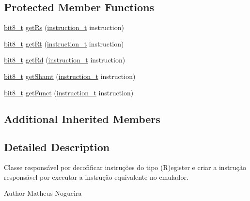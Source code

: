 \subsection*{Protected Member Functions}
\begin{DoxyCompactItemize}
\item 
\hyperlink{core_8hpp_a6074bae122ae7b527864eec42c728c3c}{bit8\+\_\+t} \hyperlink{classMIPS_1_1InstructionIDecoder_aece98d1c7f45c00c931e5955c1ec0bc1}{get\+Rs} (\hyperlink{core_8hpp_aa514fd240a0e29abb2a2e4c805d7f1a4}{instruction\+\_\+t} instruction)
\item 
\hyperlink{core_8hpp_a6074bae122ae7b527864eec42c728c3c}{bit8\+\_\+t} \hyperlink{classMIPS_1_1InstructionIDecoder_aec36994fb257983090e6f31b5c40ca6a}{get\+Rt} (\hyperlink{core_8hpp_aa514fd240a0e29abb2a2e4c805d7f1a4}{instruction\+\_\+t} instruction)
\item 
\hyperlink{core_8hpp_a6074bae122ae7b527864eec42c728c3c}{bit8\+\_\+t} \hyperlink{classMIPS_1_1InstructionIDecoder_a50819a3f711de2efa9033f27733b1562}{get\+Rd} (\hyperlink{core_8hpp_aa514fd240a0e29abb2a2e4c805d7f1a4}{instruction\+\_\+t} instruction)
\item 
\hyperlink{core_8hpp_a6074bae122ae7b527864eec42c728c3c}{bit8\+\_\+t} \hyperlink{classMIPS_1_1InstructionIDecoder_a9b3ae24c21814fcc896678ca70bedf90}{get\+Shamt} (\hyperlink{core_8hpp_aa514fd240a0e29abb2a2e4c805d7f1a4}{instruction\+\_\+t} instruction)
\item 
\hyperlink{core_8hpp_a6074bae122ae7b527864eec42c728c3c}{bit8\+\_\+t} \hyperlink{classMIPS_1_1InstructionIDecoder_a92735572aec9bdfd68d32af29b4ab86e}{get\+Funct} (\hyperlink{core_8hpp_aa514fd240a0e29abb2a2e4c805d7f1a4}{instruction\+\_\+t} instruction)
\end{DoxyCompactItemize}
\subsection*{Additional Inherited Members}


\subsection{Detailed Description}
Classe responsável por decofificar instruções do tipo (R)egister e criar a instrução responsável por executar a instrução equivalente no emulador.

\begin{DoxyAuthor}{Author}
Matheus Nogueira 
\end{DoxyAuthor}


